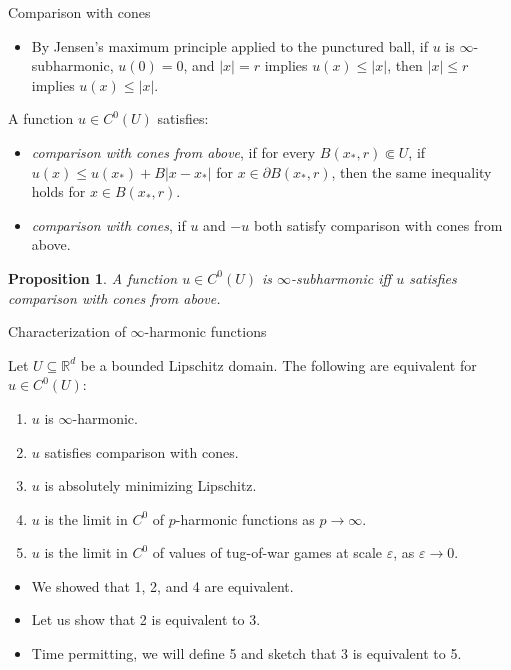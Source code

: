 \documentclass[10pt]{beamer}
\newcommand{\RR}{\mathbb{R}}
\newtheorem{proposition}{Proposition}
\begin{document}
\begin{frame}{Comparison with cones}

\begin{itemize}
\item By Jensen's maximum principle applied to the punctured ball, if $u$ is $\infty$-subharmonic, $u(0) = 0$, and $|x| = r$ implies $u(x) \leq |x|$, then $|x| \leq r$ implies $u(x) \leq |x|$. \pause
\end{itemize}

\begin{definition}
A function $u \in C^0(U)$ satisfies: 
\begin{itemize}
\item \emph{comparison with cones from above}, if for every $B(x_*, r) \Subset U$, if $u(x) \leq u(x_*) + B|x - x_*|$ for $x \in \partial B(x_*, r)$, then the same inequality holds for $x \in B(x_*, r)$.
\item \emph{comparison with cones}, if $u$ and $-u$ both satisfy comparison with cones from above. \pause
\end{itemize}
\end{definition}

\begin{proposition}
A function $u \in C^0(U)$ is $\infty$-subharmonic iff $u$ satisfies comparison with cones from above.
\end{proposition}
\end{frame}

\begin{frame}{Characterization of $\infty$-harmonic functions}
\begin{theorem}
Let $U \subseteq \RR^d$ be a bounded Lipschitz domain.
The following are equivalent for $u \in C^0(U)$: 
\begin{enumerate}
\item $u$ is $\infty$-harmonic. 
\item $u$ satisfies comparison with cones. 
\item $u$ is absolutely minimizing Lipschitz. 
\item $u$ is the limit in $C^0$ of $p$-harmonic functions as $p \to \infty$. 
\item $u$ is the limit in $C^0$ of values of tug-of-war games at scale $\varepsilon$, as $\varepsilon \to 0$. \pause
\end{enumerate}
\end{theorem}
    
\begin{itemize}
    \item We showed that 1, 2, and 4 are equivalent. 
    \item Let us show that 2 is equivalent to 3. 
    \item Time permitting, we will define 5 and sketch that 3 is equivalent to 5.
\end{itemize}
\end{frame}
\end{document}
